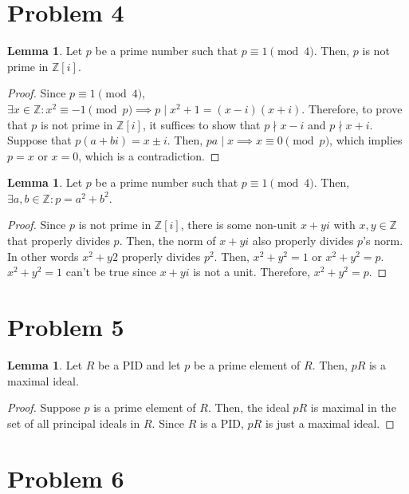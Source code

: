 \documentclass{article}
\theoremstyle{definition}
\newtheorem{lemma}[theorem]{Lemma}
\begin{document}
\section{Problem 4}

\begin{lemma}
    Let $p$ be a prime number such that $p \equiv 1 \pmod{4}$. Then, $p$ is not prime in $\mathbb{Z}[i]$.
\end{lemma}
\begin{proof}
    Since $p \equiv 1 \pmod{4}$, $\exists x \in \mathbb{Z}: x^{2} \equiv -1 \pmod{p} \implies p \mid x^{2} + 1 = (x - i)(x + i)$. Therefore, to prove that $p$ is not prime in $\mathbb{Z}[i]$, it suffices to show that $p \nmid x - i$ and $p \nmid x + i$. Suppose that $p(a + bi) = x \pm i$. Then, $pa \mid x \implies x \equiv 0 \pmod p$, which implies $p = x$ or $x = 0$, which is a contradiction.
\end{proof}

\begin{lemma}
    Let $p$ be a prime number such that $p \equiv 1 \pmod{4}$. Then, $\exists a,b \in \mathbb{Z}: p = a^{2} + b^{2}$.
\end{lemma}
\begin{proof}
    Since $p$ is not prime in $\mathbb{Z}[i]$, there is some non-unit $x + yi$ with $x,y \in \mathbb{Z}$ that properly divides $p$. Then, the norm of $x + yi$ also properly divides $p$'s norm. In other words $x^{2} + y{2}$ properly divides $p^{2}$. Then, $x^{2} + y^{2} = 1$ or $x^{2} + y^2 = p$. $x^{2} + y^{2} = 1$ can't be true since $x + yi$ is not a unit. Therefore, $x^{2} + y^{2} = p$.
\end{proof}

\section{Problem 5}

\begin{lemma}
    Let $R$ be a PID and let $p$ be a prime element of $R$. Then, $pR$ is a maximal ideal.
\end{lemma}
\begin{proof}
    Suppose $p$ is a prime element of $R$. Then, the ideal $pR$ is maximal in the set of all principal ideals in $R$. Since $R$ is a PID, $pR$ is just a maximal ideal.
\end{proof}

\section{Problem 6}
\end{document}
